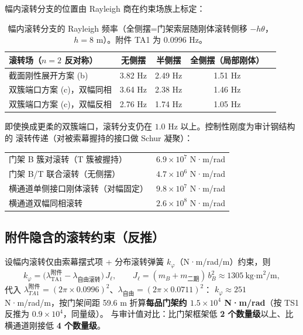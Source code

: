 \documentclass[11pt,a4paper]{ctexart}
\begin{document}
幅内滚转分支的位置由 Rayleigh 商在约束场族上标定：

\begin{table}[h]\centering\small
\begin{tabular}{lcccc}
\toprule
滚转场（$n=2$ 反对称） & 无侧摆 & 半侧摆 & 全侧摆（局部刚体） \\
\midrule
截面刚性展开方案 (b) & 3.82 Hz & 2.49 Hz & 1.51 Hz \\
双簇端口方案 (c)，双幅同相 & 3.64 Hz & 2.38 Hz & 1.46 Hz \\
双簇端口方案 (c)，双幅反相 & 2.76 Hz & 1.74 Hz & 1.05 Hz \\
\bottomrule
\end{tabular}
\caption{幅内滚转分支的 Rayleigh 频率（全侧摆=门架索层随刚体滚转侧移 $-h\theta$，
$h=8$ m）。附件 TA1 为 0.0996 Hz。}
\label{tab:rayleigh}
\end{table}

即使换成更柔的双簇端口，滚转分支仍在 $1.0$ Hz 以上。控制性刚度为审计钢结构的
滚转传递（对被索幕握持的接口做 Schur 凝聚）：
\begin{center}
\begin{tabular}{ll}
门架 B 簇对滚转（T 簇被握持） & $6.9\times10^{7}$ N·m/rad \\
门架 B/T 联合滚转（无侧摆） & $4.7\times10^{6}$ N·m/rad \\
横通道单侧接口刚体滚转（对幅固定） & $9.8\times10^{7}$ N·m/rad \\
横通道双幅同相滚转 & $2.6\times10^{8}$ N·m/rad \\
\end{tabular}
\end{center}

\subsection{附件隐含的滚转约束（反推）}

设幅内滚转仅由索幕摆式项 + 分布滚转弹簧 $k_\varphi$（N·m/rad/m）约束，则
\begin{equation}
k_\varphi=\big(\lambda_{\text{TA1}}^{\text{附件}}-\lambda_{\text{自由滚转}}\big)\,J_\ell,
\qquad
J_\ell=(m_B+m_{\text{二期}})\,b_B^2\approx1305\ \text{kg·m}^2/\text{m},
\end{equation}
代入 $\lambda^{附件}_{TA1}=(2\pi\times0.0996)^2$、$\lambda_{\text{自由}}=(2\pi\times0.0711)^2$：
$k_\varphi\approx251$ N·m/rad/m，按门架间距 59.6 m 折算\textbf{每品门架约
$1.5\times10^{4}$ N·m/rad}（按 TS1 反推为 $0.9\times10^{4}$，同量级）。
与审计值对比：比门架框架低 \textbf{2 个数量级}以上、比横通道刚接低 \textbf{4 个数量级}。
\end{document}
